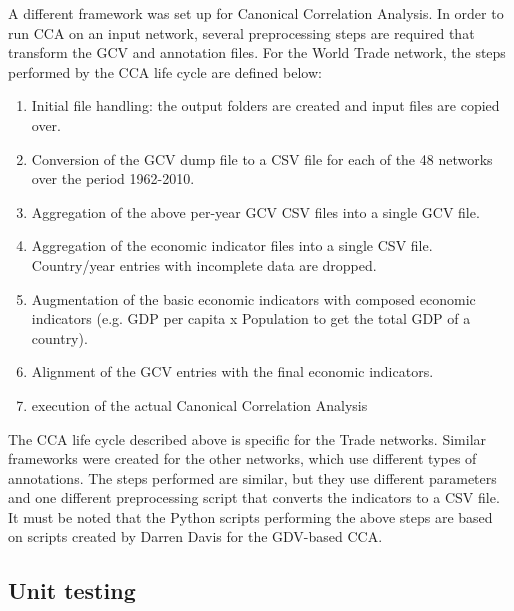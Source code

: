 A different framework was set up for Canonical Correlation Analysis. In order to run CCA on an input network, several preprocessing steps are required that transform the GCV and annotation files. For the World Trade network, the steps performed by the CCA life cycle are defined below:
\begin{enumerate}
 \item Initial file handling: the output folders are created and input files are copied over.
 \item Conversion of the GCV dump file to a CSV file for each of the 48 networks over the period 1962-2010.
 \item Aggregation of the above per-year GCV CSV files into a single GCV file.
 \item Aggregation of the economic indicator files into a single CSV file. Country/year entries with incomplete data are dropped.
 \item Augmentation of the basic economic indicators with composed economic indicators (e.g. GDP per capita x Population to get the total GDP of a country).
 \item Alignment of the GCV entries with the final economic indicators.
 \item execution of the actual Canonical Correlation Analysis
\end{enumerate}


The CCA life cycle described above is specific for the Trade networks. Similar frameworks were created for the other networks, which use different types of annotations. The steps performed are similar, but they use different parameters and one different preprocessing script that converts the indicators to a CSV file. It must be noted that the Python scripts performing the above steps are based on scripts created by Darren Davis for the GDV-based CCA.

\subsection{Unit testing}

